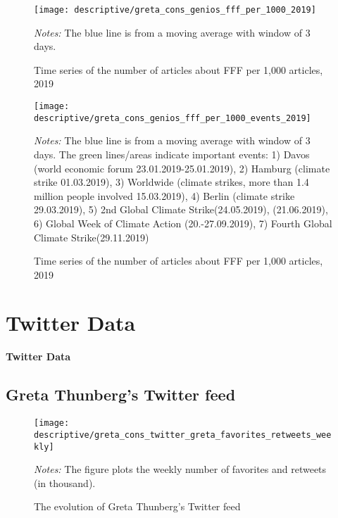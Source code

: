 \documentclass[11pt, a4paper]{article} %
\begin{document}
\begin{figure}[H]\centering
	\caption{Time series of the number of articles about FFF per 1,000 articles, 2019}
	\texttt{[image: descriptive/greta\_cons\_genios\_fff\_per\_1000\_2019]}
	\begin{minipage}{\linewidth}
		\scriptsize{\emph{Notes:} The blue line is from a moving average with window of 3 days.}
	\end{minipage}
\end{figure}


\begin{figure}[H]\centering
	\caption{Time series of the number of articles about FFF per 1,000 articles, 2019}
	\texttt{[image: descriptive/greta\_cons\_genios\_fff\_per\_1000\_events\_2019]}
	\begin{minipage}{\linewidth}
		\scriptsize{\emph{Notes:} The blue line is from a moving average with window of 3 days. The green lines/areas indicate important events: 1) Davos (world economic forum 23.01.2019-25.01.2019), 2) Hamburg (climate strike 01.03.2019), 3) Worldwide (climate strikes, more than 1.4 million people involved 15.03.2019), 4) Berlin (climate strike 29.03.2019), 5) 2nd Global Climate Strike(24.05.2019), (21.06.2019), 6) Global Week of Climate Action (20.-27.09.2019), 7) Fourth Global Climate Strike(29.11.2019)}
	\end{minipage}
\end{figure}



\newpage
\TODO\section{Twitter Data}
\vspace*{\fill}
{\Huge \begin{center}\textbf{Twitter Data}\end{center}}
\vspace*{\fill}\clearpage
\subsection{Greta Thunberg's Twitter feed}
\begin{figure}[H]\centering
	\caption{The evolution of Greta Thunberg's Twitter feed}
	\texttt{[image: descriptive/greta\_cons\_twitter\_greta\_favorites\_retweets\_weekly]}
	\begin{minipage}{\linewidth}
		\scriptsize{\emph{Notes:} The figure plots the weekly number of favorites and retweets (in thousand).}
	\end{minipage}
\end{figure}
\end{document}
